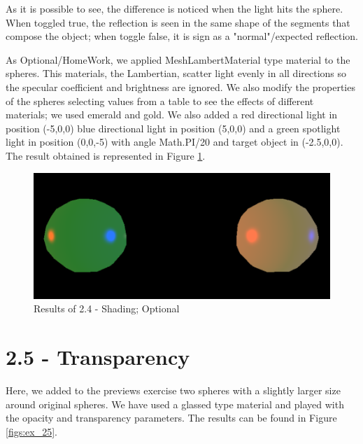 \documentclass[12pt]{article}
\begin{document}
As it is possible to see, the difference is noticed when the light hits the sphere. When toggled true, the reflection is seen in the same shape of the segments that compose the object; when toggle false, it is sign as a "normal"/expected reflection.\par

As Optional/HomeWork, we applied MeshLambertMaterial type material to the spheres. This materials, the Lambertian, scatter light evenly in all directions so the specular coefficient and brightness are ignored. We also modify the properties of the spheres selecting values from a table to see the effects of different materials; we used emerald and gold.\newline
We also added a red directional light in position (-5,0,0) blue directional light in position (5,0,0) and a green spotlight light in position (0,0,-5) with angle Math.PI/20 and target object in (-2.5,0,0). The result obtained is represented in Figure \ref{figs:ex_24_3}.

\begin{figure}[!h]
    \centering
        \includegraphics[width = \textwidth]{figs/ex_24_3.png}
        \caption{Results of 2.4 - Shading; Optional}
        \label{figs:ex_24_3}
\end{figure}

\section*{2.5 - Transparency}
\label{ex_25}

Here, we added to the previews exercise two spheres with a slightly larger size around original spheres.\newline
We have used a glassed type material and played with the opacity and transparency parameters. The results can be found in Figure \ref{figs:ex_25}.
\end{document}
